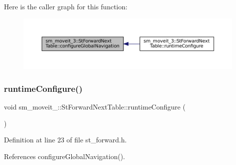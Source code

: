 Here is the caller graph for this function\+:
\nopagebreak
\begin{figure}[H]
\begin{center}
\leavevmode
\includegraphics[width=350pt]{structsm__moveit__3_1_1StForwardNextTable_a0027b604f471fad11d66c027a3ef662a_icgraph}
\end{center}
\end{figure}
\mbox{\label{structsm__moveit__3_1_1StForwardNextTable_ab6ec25ee10deb9b3da36fc1baf87cd10}} 
\subsubsection{\texorpdfstring{runtime\+Configure()}{runtimeConfigure()}}
{\footnotesize\ttfamily void sm\+\_\+moveit\+\_\+::\+St\+Forward\+Next\+Table\+::runtime\+Configure (\begin{DoxyParamCaption}{ }\end{DoxyParamCaption})\hspace{0.3cm}{\ttfamily [inline]}}



Definition at line 23 of file st\+\_\+forward.\+h.



References configure\+Global\+Navigation().



